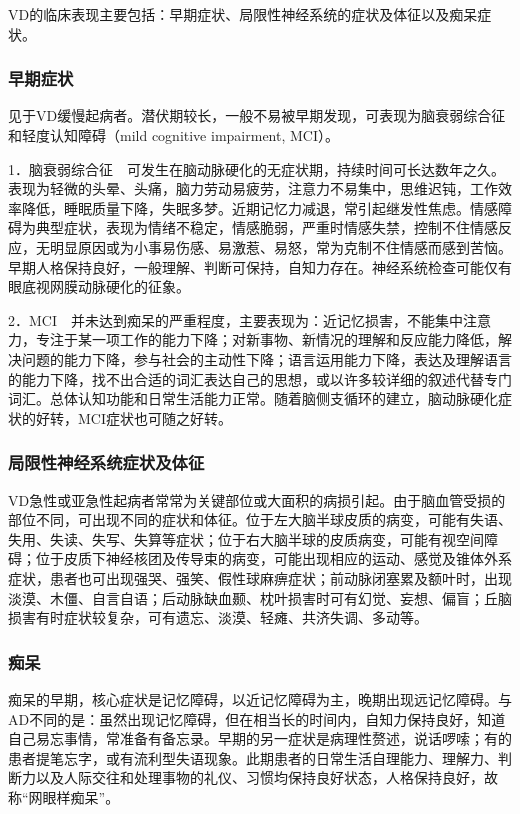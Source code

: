 VD的临床表现主要包括：早期症状、局限性神经系统的症状及体征以及痴呆症状。

\subsubsection{早期症状}

见于VD缓慢起病者。潜伏期较长，一般不易被早期发现，可表现为脑衰弱综合征和轻度认知障碍（mild
cognitive impairment, MCI）。

1．脑衰弱综合征　可发生在脑动脉硬化的无症状期，持续时间可长达数年之久。表现为轻微的头晕、头痛，脑力劳动易疲劳，注意力不易集中，思维迟钝，工作效率降低，睡眠质量下降，失眠多梦。近期记忆力减退，常引起继发性焦虑。情感障碍为典型症状，表现为情绪不稳定，情感脆弱，严重时情感失禁，控制不住情感反应，无明显原因或为小事易伤感、易激惹、易怒，常为克制不住情感而感到苦恼。早期人格保持良好，一般理解、判断可保持，自知力存在。神经系统检查可能仅有眼底视网膜动脉硬化的征象。

2．MCI　并未达到痴呆的严重程度，主要表现为：近记忆损害，不能集中注意力，专注于某一项工作的能力下降；对新事物、新情况的理解和反应能力降低，解决问题的能力下降，参与社会的主动性下降；语言运用能力下降，表达及理解语言的能力下降，找不出合适的词汇表达自己的思想，或以许多较详细的叙述代替专门词汇。总体认知功能和日常生活能力正常。随着脑侧支循环的建立，脑动脉硬化症状的好转，MCI症状也可随之好转。

\subsubsection{局限性神经系统症状及体征}

VD急性或亚急性起病者常常为关键部位或大面积的病损引起。由于脑血管受损的部位不同，可出现不同的症状和体征。位于左大脑半球皮质的病变，可能有失语、失用、失读、失写、失算等症状；位于右大脑半球的皮质病变，可能有视空间障碍；位于皮质下神经核团及传导束的病变，可能出现相应的运动、感觉及锥体外系症状，患者也可出现强哭、强笑、假性球麻痹症状；前动脉闭塞累及额叶时，出现淡漠、木僵、自言自语；后动脉缺血颞、枕叶损害时可有幻觉、妄想、偏盲；丘脑损害有时症状较复杂，可有遗忘、淡漠、轻瘫、共济失调、多动等。

\subsubsection{痴呆}

痴呆的早期，核心症状是记忆障碍，以近记忆障碍为主，晚期出现远记忆障碍。与AD不同的是：虽然出现记忆障碍，但在相当长的时间内，自知力保持良好，知道自己易忘事情，常准备有备忘录。早期的另一症状是病理性赘述，说话啰嗦；有的患者提笔忘字，或有流利型失语现象。此期患者的日常生活自理能力、理解力、判断力以及人际交往和处理事物的礼仪、习惯均保持良好状态，人格保持良好，故称“网眼样痴呆”。

